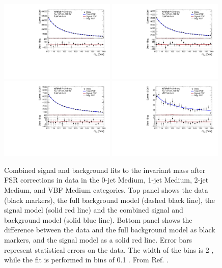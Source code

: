 \begin{figure}[h!]
  \centering
  \includegraphics[width=0.49\textwidth]{figures/hmumu/fits/BDT11}
  \includegraphics[width=0.49\textwidth]{figures/hmumu/fits/BDT8}
  \includegraphics[width=0.49\textwidth]{figures/hmumu/fits/BDT5}
  \includegraphics[width=0.49\textwidth]{figures/hmumu/fits/BDT2}
  \caption[Combined signal and background fit to data for Medium categories]{
  Combined signal and background fits to the invariant mass after FSR
  corrections in data in the 0-jet Medium, 1-jet Medium, 2-jet Medium,
  and VBF Medium categories. Top panel shows the data (black
  markers), the full background model (dashed black line), the signal
  model (solid red line) and the combined signal and background model
  (solid blue line). Bottom panel shows the difference between the data
  and the full background model as black markers, and the signal model
  as a solid red line. Error bars represent statistical errors on
  the data. The width of the bins is 2 \GeV, while the fit is
  performed in bins of 0.1 \GeV.
  From Ref. \cite{ATLAS-CONF-2019-028}.
  }
  \label{fig:hmumu:fit-medium}
\end{figure}




